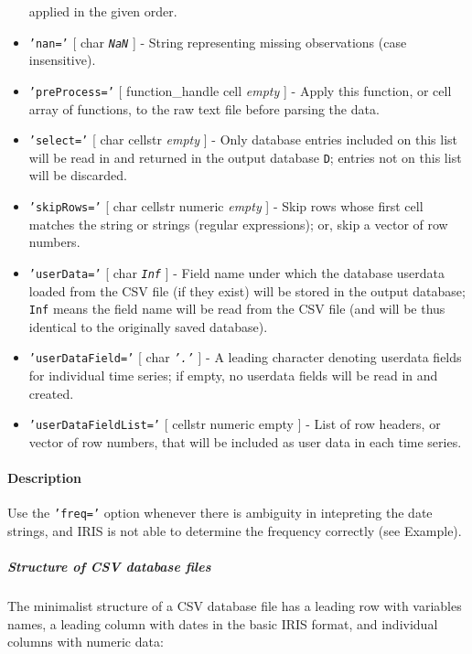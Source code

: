 \begin{itemize}
  applied in the given order.
\item
  \texttt{'nan='} {[} char \textbar{} \emph{\texttt{NaN}} {]} - String
  representing missing observations (case insensitive).
\item
  \texttt{'preProcess='} {[} function\_handle \textbar{} cell \textbar{}
  \emph{empty} {]} - Apply this function, or cell array of functions, to
  the raw text file before parsing the data.
\item
  \texttt{'select='} {[} char \textbar{} cellstr \textbar{} \emph{empty}
  {]} - Only database entries included on this list will be read in and
  returned in the output database \texttt{D}; entries not on this list
  will be discarded.
\item
  \texttt{'skipRows='} {[} char \textbar{} cellstr \textbar{} numeric
  \textbar{} \emph{empty} {]} - Skip rows whose first cell matches the
  string or strings (regular expressions); or, skip a vector of row
  numbers.
\item
  \texttt{'userData='} {[} char \textbar{} \emph{\texttt{Inf}} {]} -
  Field name under which the database userdata loaded from the CSV file
  (if they exist) will be stored in the output database; \texttt{Inf}
  means the field name will be read from the CSV file (and will be thus
  identical to the originally saved database).
\item
  \texttt{'userDataField='} {[} char \textbar{} \emph{\texttt{'.'}} {]}
  - A leading character denoting userdata fields for individual time
  series; if empty, no userdata fields will be read in and created.
\item
  \texttt{'userDataFieldList='} {[} cellstr \textbar{} numeric
  \textbar{} empty {]} - List of row headers, or vector of row numbers,
  that will be included as user data in each time series.
\end{itemize}

\paragraph{Description}

Use the \texttt{'freq='} option whenever there is ambiguity in
intepreting the date strings, and IRIS is not able to determine the
frequency correctly (see Example).

\subparagraph{Structure of CSV database
files}

The minimalist structure of a CSV database file has a leading row with
variables names, a leading column with dates in the basic IRIS format,
and individual columns with numeric data:

